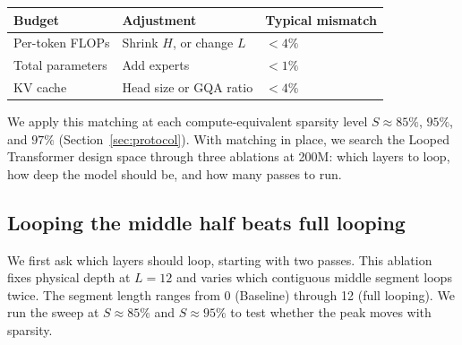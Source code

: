 \documentclass[]{bytedance_seed}
\theoremstyle{definition}
\theoremstyle{remark}
\begin{document}
\begin{center}
\small
{}
\label{tab:matching}
\begin{tabular}{lll}
\toprule
Budget & Adjustment & Typical mismatch \\
\midrule
Per-token FLOPs & Shrink $H$, or change $L$ & $<4\%$ \\
Total parameters & Add experts & $<1\%$ \\
KV cache & Head size or GQA ratio & $<4\%$ \\
\bottomrule
\end{tabular}
\end{center}

We apply this matching at each compute-equivalent sparsity level $S \approx 85\%$, $95\%$, and $97\%$ (Section~\ref{sec:protocol}).
%
With matching in place, we search the Looped Transformer design space through three ablations at 200M: which layers to loop, how deep the model should be, and how many passes to run.
%

\subsection{Looping the middle half beats full looping}
\label{sec:loop-span}

We first ask which layers should loop, starting with two passes.
%
This ablation fixes physical depth at $L = 12$ and varies which contiguous middle segment loops twice.
%
The segment length ranges from 0 (Baseline) through 12 (full looping).
%
We run the sweep at $S \approx 85\%$ and $S \approx 95\%$ to test whether the peak moves with sparsity.
%
\end{document}
